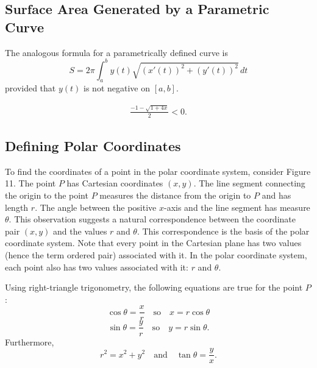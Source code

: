 \documentclass{report}
\begin{document}
    \pagebreak 
    \subsection{Surface Area Generated by a Parametric Curve}
    \bigbreak \noindent 
    \begin{thrmm}
        The analogous formula for a parametrically defined curve is
        \[
            S = 2\pi \int_{a}^{b} y(t) \sqrt{(x'(t))^2 + (y'(t))^2} \, dt
        \]
        provided that \( y(t) \) is not negative on \([a, b]\).
    \end{thrmm}

    \begin{align*}
        \frac{-1-\sqrt{1+4x}}{2} < 0 
    .\end{align*}
    

    \pagebreak 
    \bigbreak \noindent 
    \subsection{Defining Polar Coordinates}
    \bigbreak \noindent 
    \begin{minipage}[]{0.47\textwidth}
        To find the coordinates of a point in the polar coordinate system, consider Figure 11. The point \( P \) has Cartesian coordinates \((x, y)\). The line segment connecting the origin to the point \( P \) measures the distance from the origin to \( P \) and has length \( r \). The angle between the positive \( x \)-axis and the line segment has measure \( \theta \). This observation suggests a natural correspondence between the coordinate pair \((x, y)\) and the values \( r \) and \( \theta \). This correspondence is the basis of the polar coordinate system. Note that every point in the Cartesian plane has two values (hence the term ordered pair) associated with it. In the polar coordinate system, each point also has two values associated with it: \( r \) and \( \theta \).
    \end{minipage}
    \hspace{.1in}
    \begin{minipage}[]{0.47\textwidth}
    \end{minipage}
    \bigbreak \noindent 
    Using right-triangle trigonometry, the following equations are true for the point \( P \):
    \[
        \cos \theta = \frac{x}{r} \quad \text{so} \quad x = r \cos \theta
    \]
    \[
        \sin \theta = \frac{y}{r} \quad \text{so} \quad y = r \sin \theta.
    \]
    Furthermore,
    \[
        r^2 = x^2 + y^2 \quad \text{and} \quad \tan \theta = \frac{y}{x}.
    \]
\end{document}
